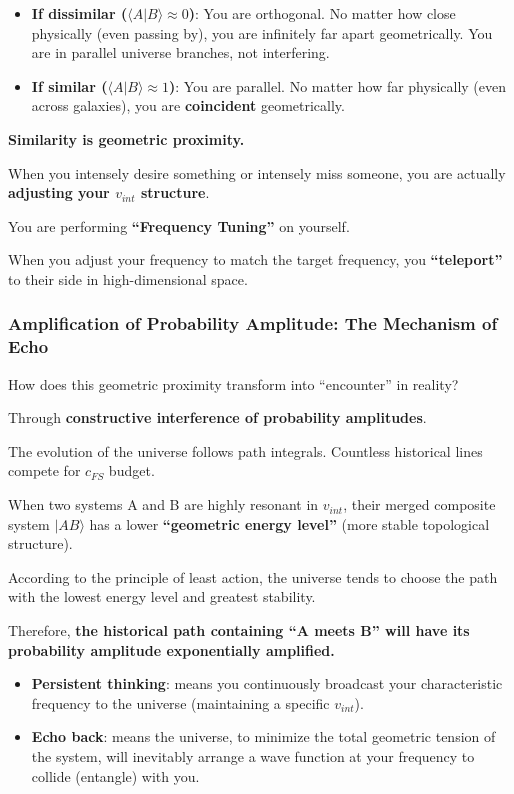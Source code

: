 \begin{itemize}
\item \textbf{If dissimilar ($\langle A | B \rangle \approx 0$)}: You are orthogonal. No matter how close physically (even passing by), you are infinitely far apart geometrically. You are in parallel universe branches, not interfering.

\item \textbf{If similar ($\langle A | B \rangle \approx 1$)}: You are parallel. No matter how far physically (even across galaxies), you are \textbf{coincident} geometrically.
\end{itemize}

\textbf{Similarity is geometric proximity.}

When you intensely desire something or intensely miss someone, you are actually \textbf{adjusting your $v_{int}$ structure}.

You are performing \textbf{``Frequency Tuning''} on yourself.

When you adjust your frequency to match the target frequency, you \textbf{``teleport''} to their side in high-dimensional space.

\subsubsection{Amplification of Probability Amplitude: The Mechanism of Echo}

How does this geometric proximity transform into ``encounter'' in reality?

Through \textbf{constructive interference of probability amplitudes}.

The evolution of the universe follows path integrals. Countless historical lines compete for $c_{FS}$ budget.

When two systems A and B are highly resonant in $v_{int}$, their merged composite system $|AB\rangle$ has a lower \textbf{``geometric energy level''} (more stable topological structure).

According to the principle of least action, the universe tends to choose the path with the lowest energy level and greatest stability.

Therefore, \textbf{the historical path containing ``A meets B'' will have its probability amplitude exponentially amplified.}

\begin{itemize}
\item \textbf{Persistent thinking}: means you continuously broadcast your characteristic frequency to the universe (maintaining a specific $v_{int}$).

\item \textbf{Echo back}: means the universe, to minimize the total geometric tension of the system, will inevitably arrange a wave function at your frequency to collide (entangle) with you.
\end{itemize}


